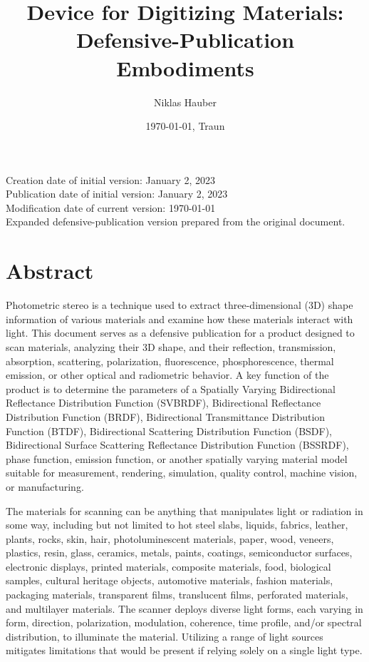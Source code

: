 \documentclass[11pt, twoside, listof=totocnumbered, bibliography=totocnumbered]{scrartcl}
\title{Device for Digitizing Materials: Defensive-Publication Embodiments}
\author{Niklas Hauber}
\date{\today{}, Traun}
\begin{document}
	\maketitle
	Creation date of initial version: January 2, 2023\\
	Publication date of initial version: January 2, 2023\\
	Modification date of current version: \today{}\\
	Expanded defensive-publication version prepared from the original document.\\
	
	\section{Abstract}
	Photometric stereo is a technique used to extract three-dimensional (3D) shape information of various materials and examine how these materials interact with light. This document serves as a defensive publication for a product designed to scan materials, analyzing their 3D shape, and their reflection, transmission, absorption, scattering, polarization, fluorescence, phosphorescence, thermal emission, or other optical and radiometric behavior. A key function of the product is to determine the parameters of a Spatially Varying Bidirectional Reflectance Distribution Function (SVBRDF), Bidirectional Reflectance Distribution Function (BRDF), Bidirectional Transmittance Distribution Function (BTDF), Bidirectional Scattering Distribution Function (BSDF), Bidirectional Surface Scattering Reflectance Distribution Function (BSSRDF), phase function, emission function, or another spatially varying material model suitable for measurement, rendering, simulation, quality control, machine vision, or manufacturing.
	
	The materials for scanning can be anything that manipulates light or radiation in some way, including but not limited to hot steel slabs, liquids, fabrics, leather, plants, rocks, skin, hair, photoluminescent materials, paper, wood, veneers, plastics, resin, glass, ceramics, metals, paints, coatings, semiconductor surfaces, electronic displays, printed materials, composite materials, food, biological samples, cultural heritage objects, automotive materials, fashion materials, packaging materials, transparent films, translucent films, perforated materials, and multilayer materials. The scanner deploys diverse light forms, each varying in form, direction, polarization, modulation, coherence, time profile, and/or spectral distribution, to illuminate the material. Utilizing a range of light sources mitigates limitations that would be present if relying solely on a single light type. \cite{SURVEY}
	
\end{document}
